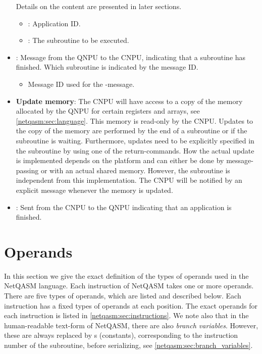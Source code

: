 \begin{itemize}
        Details on the content are presented in later sections.
        \begin{itemize}
            \item {}: Application ID.
            \item {}: The subroutine to be executed.
        \end{itemize}
  \item {}:
        Message from the \ac{QNPU} to the \ac{CNPU}, indicating that a subroutine has finished.
        Which subroutine is indicated by the message ID.
        \begin{itemize}
            \item {} Message ID used for the -message.
        \end{itemize}
  \item \textbf{Update memory}:
        The \ac{CNPU} will have access to a copy of the memory allocated by the \ac{QNPU} for certain registers and arrays, see \cref{netqasm:sec:language}.
        This memory is read-only by the \ac{CNPU}.
        Updates to the copy of the memory are performed by the end of a subroutine or if the subroutine is waiting.
        Furthermore, updates need to be explicitly specified in the subroutine by using one of the return-commands.
        How the actual update is implemented depends on the platform and can either be done by message-passing or with an actual shared memory.
        However, the subroutine is independent from this implementation.
        The \ac{CNPU} will be notified by an explicit message whenever the memory is updated.
  \item {}:
        Sent from the \ac{CNPU} to the \ac{QNPU} indicating that an application is finished.
\end{itemize}


\section{Operands}
\label{netqasm:sec:operands}
In this section we give the exact definition of the types of operands used in the \ac{NetQASM} language.
Each instruction of \ac{NetQASM} takes one or more operands.
There are five types of operands, which are listed and described below.
Each instruction has a fixed types of operands at each position.
The exact operands for each instruction is listed in \cref{netqasm:sec:instructions}.
We note also that in the human-readable text-form of \ac{NetQASM}, there are also \textit{branch variables}.
However, these are always replaced by \IMMEDIATE{}s (constants), corresponding to the instruction number of the subroutine, before serializing, see \cref{netqasm:sec:branch_variables}.

